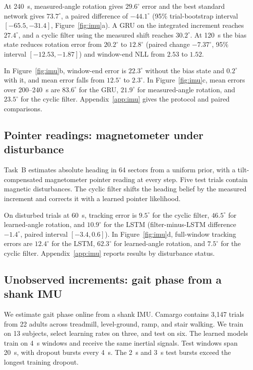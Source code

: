 At 240~s, measured-angle rotation gives $29.6^\circ$ error and the best
standard network gives $73.7^\circ$, a paired difference of $-44.1^\circ$
(95\% trial-bootstrap interval $[-65.5,-31.4]$, Figure~\ref{fig:imu}a).
A GRU on the integrated increment reaches $27.4^\circ$, and a cyclic filter
using the measured shift reaches $30.2^\circ$. At 120~s the bias state
reduces rotation error from $20.2^\circ$ to $12.8^\circ$ (paired change
$-7.37^\circ$, 95\% interval $[-12.53,-1.87]$) and window-end NLL from
$2.53$ to $1.52$.

In Figure~\ref{fig:imu}b, window-end error is $22.3^\circ$ without the bias
state and $0.2^\circ$ with it, and mean error falls from $12.5^\circ$ to
$2.3^\circ$. In Figure~\ref{fig:imu}c, mean errors over 200--240~s are
$83.6^\circ$ for the GRU, $21.9^\circ$ for measured-angle rotation, and
$23.5^\circ$ for the cyclic filter. Appendix~\ref{app:imu} gives the
protocol and paired comparisons.

\subsection{Pointer readings: magnetometer under disturbance}
\label{sec:imu-mag}
Task~B estimates absolute heading in 64 sectors from a uniform prior, with a
tilt-compensated magnetometer pointer reading at every step. Five test trials
contain magnetic disturbances. The cyclic filter shifts the heading belief
by the measured increment and corrects it with a learned pointer likelihood.

On disturbed trials at 60~s, tracking error is $9.5^\circ$ for the cyclic
filter, $46.5^\circ$ for learned-angle rotation, and $10.9^\circ$ for the
LSTM (filter-minus-LSTM difference $-1.4^\circ$, paired interval $[-3.4,0.6]$).
In Figure~\ref{fig:imu}d, full-window tracking errors are $12.4^\circ$ for
the LSTM, $62.3^\circ$ for learned-angle rotation, and $7.5^\circ$ for the
cyclic filter. Appendix~\ref{app:imu} reports results by disturbance status.

\subsection{Unobserved increments: gait phase from a shank IMU}
\label{sec:gait}
We estimate gait phase online from a shank IMU. Camargo contains 3,147
trials from 22 adults across treadmill, level-ground, ramp, and stair
walking. We train on 13 subjects, select learning rates on three, and
test on six. The learned models train on 4~s windows and receive the
same inertial signals. Test windows span 20~s, with dropout bursts
every 4~s. The 2~s and 3~s test bursts exceed the longest training
dropout.

